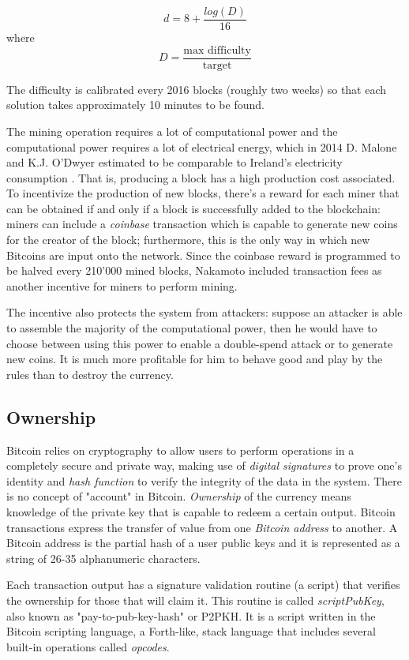 		\[ d = 8 + \frac{log(D)}{16}\] 
		where
		\[D = \frac{\text{max difficulty}}{\text{target}}\]
		
		The difficulty is calibrated every 2016 blocks (roughly two weeks) so that each solution takes approximately 10 minutes to be found. 
		
		The mining operation requires a lot of computational power and the computational power requires a lot of electrical energy, which in 2014 D. Malone and  K.J. O'Dwyer estimated to be comparable to Ireland's electricity consumption \cite{Malone2014}. That is, producing a block has a high production cost associated. To incentivize the production of new blocks, there's a reward for each miner that can be obtained if and only if a block is successfully added to the blockchain: miners can include a \textit{coinbase} transaction which is capable to generate new coins for the creator of the block; furthermore, this is the only way in which new Bitcoins are input onto the network. Since the coinbase reward is programmed to be halved every 210'000 mined blocks, Nakamoto included transaction fees as another incentive for miners to perform mining.
		
		The incentive also protects the system from attackers: suppose an attacker is able to assemble the majority of the computational power, then he would have to choose between using this power to enable a double-spend attack or to generate new coins. It is much more profitable for him to behave good and play by the rules than to destroy the currency.
		
		\newpage
		
		\subsection{Ownership}
		
		Bitcoin relies on cryptography to allow users to perform operations in a completely secure and private way, making use of \textit{digital signatures} to prove one's identity and \textit{hash function} to verify the integrity of the data in the system.
		There is no concept of "account" in Bitcoin. \textit{Ownership} of the currency means knowledge of the private key that is capable to redeem a certain output. 	Bitcoin transactions express the transfer of value from one \textit{Bitcoin address} to another. A Bitcoin address is the partial hash of a user public keys and it is represented as a string of 26-35 alphanumeric characters.
		
		Each transaction output has a signature validation routine (a script) that verifies the ownership for those that will claim it. This routine is called \textit{scriptPubKey}, also known as "pay-to-pub-key-hash" or P2PKH. It is a script written in the Bitcoin scripting language, a Forth-like, stack language that includes several built-in operations called \textit{opcodes}. 
		
